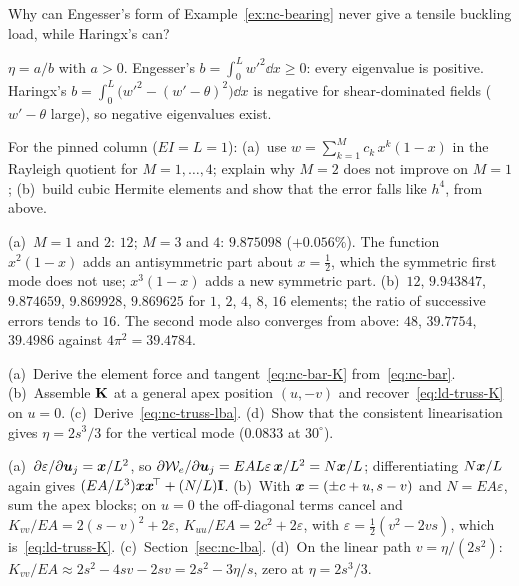 \label{exo:nc-tension}
%
Why can Engesser's form of Example~\ref{ex:nc-bearing} never give a tensile buckling load,
while Haringx's can?
\begin{solution}
$\eta = a/b$ with $a > 0$. Engesser's $b = \displaystyle\int_0^L w'^2\dd x \ge 0$: every eigenvalue is positive.
Haringx's $b = \displaystyle\int_0^L \bigl(w'^2 - (w' - \theta)^2\bigr)\dd x$ is negative for shear-dominated fields
($w' - \theta$ large), so negative eigenvalues exist.
\end{solution}


\label{exo:nc-ritz}
%
For the pinned column ($EI = L = 1$): (a)~use $w = \sum_{k=1}^M c_k\,x^k(1 - x)$ in the
Rayleigh quotient for $M = 1, \dots, 4$; explain why $M = 2$ does not improve on $M = 1$;
(b)~build cubic Hermite elements and show that the error falls like $h^4$, from above.
\begin{solution}
(a)~$M = 1$ and $2$: $12$; $M = 3$ and $4$: $9.875098$ ($+0.056\%$). The function
$x^2(1-x)$ adds an antisymmetric part about $x = \tfrac12$, which the symmetric first mode does
not use; $x^3(1-x)$ adds a new symmetric part. (b)~$12$, $9.943847$, $9.874659$, $9.869928$,
$9.869625$ for $1$, $2$, $4$, $8$, $16$ elements; the ratio of successive errors tends to
$16$. The second mode also converges from above: $48$, $39.7754$, $39.4986$ against
$4\pi^2 = 39.4784$.

\end{solution}

\label{exo:nc-truss-fe}
%
(a)~Derive the element force and tangent~\eqref{eq:nc-bar-K} from~\eqref{eq:nc-bar}.
(b)~Assemble $\mathbf{K}$ at a general apex position $(u, -v)$ and recover~\eqref{eq:ld-truss-K} on
$u = 0$. (c)~Derive~\eqref{eq:nc-truss-lba}. (d)~Show that the consistent linearisation gives
$\eta = 2s^3/3$ for the vertical mode ($0.0833$ at $30^\circ$).
\begin{solution}
(a)~$\partial\varepsilon/\partial\bm{u}_j = \bm{x}/L^2$, so $\partial\mathcal{W}_e/\partial\bm{u}_j = EAL\varepsilon\,\bm{x}/L^2 = N\bm{x}/L$;
differentiating $N\bm{x}/L$ again gives $(EA/L^3)\bm{x}\bm{x}^{\!\top} + (N/L)\mathbf{I}$. (b)~With $\bm{x} = (\pm c + u, s - v)$
and $N = EA\varepsilon$, sum the apex blocks; on $u = 0$ the off-diagonal terms cancel and
$K_{vv}/EA = 2(s - v)^2 + 2\varepsilon$, $K_{uu}/EA = 2c^2 + 2\varepsilon$, with $\varepsilon = \tfrac12(v^2 - 2vs)$,
which is~\eqref{eq:ld-truss-K}. (c)~Section~\ref{sec:nc-lba}. (d)~On the linear path
$v = \eta/(2s^2)$: $K_{vv}/EA \approx 2s^2 - 4sv - 2sv = 2s^2 - 3\eta/s$, zero at
$\eta = 2s^3/3$.
\end{solution}

